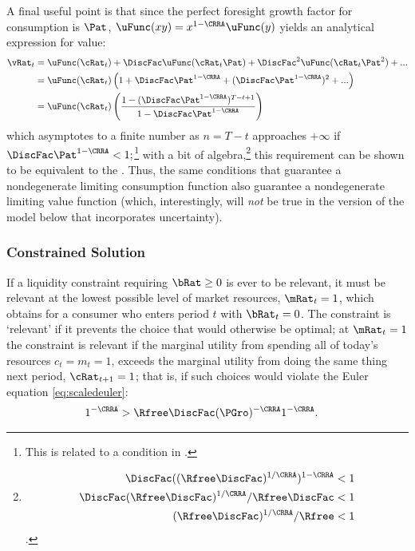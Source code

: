 \documentclass[BufferStockTheory]{subfiles}
\begin{document}
\hypertarget{ValuePFAnalytical}{}
A final useful point is that since the perfect foresight
growth factor for consumption is $\Pat$, $\uFunc(xy) =
x^{1-\CRRA}\uFunc(y)$ yields an analytical expression for value:  
\begin{equation}\begin{gathered}\begin{aligned}
  \vRat_{t}  & = \uFunc(\cRat_{t})+\DiscFac \uFunc(\cRat_{t}\Pat)+\DiscFac^{2} \uFunc(\cRat_{t} \Pat^{2})+... \label{eq:ValuePFAnalytical}
  \\  & = \uFunc(\cRat_{t})\left(1+\DiscFac \Pat^{1-\CRRA}+(\DiscFac \Pat^{1-\CRRA})^{2}+...\right) \notag 
  \\  & = \uFunc(\cRat_{t})\left(\frac{1-(\DiscFac \Pat^{1-\CRRA})^{T-t+1}}{1-\DiscFac \Pat^{1-\CRRA}}\right) \notag
\end{aligned}\end{gathered}\end{equation}
which asymptotes to a finite number as $n=T-t$ approaches $+\infty$ if $\DiscFac \Pat^{1-\CRRA} < 1;$\footnote{This is related to a condition in \cite{asHomogeneous}.} with a bit of algebra,\footnote{
  \begin{align*}
    \DiscFac ((\Rfree \DiscFac)^{1/\CRRA})^{1-\CRRA}  & < 1
    \\ \DiscFac (\Rfree\DiscFac)^{1/\CRRA}/\Rfree\DiscFac  & < 1
    \\ (\Rfree \DiscFac)^{1/\CRRA} /\Rfree  & < 1
  \end{align*}.
} this requirement can be shown to be equivalent to the {\RIC}.  Thus, the same conditions that guarantee a nondegenerate limiting consumption function also guarantee a nondegenerate limiting value function (which, interestingly, will \textit{not} be true in the version of the model below that incorporates uncertainty).


\hypertarget{Constrained-Solution}{}
\subsubsection{Constrained Solution}

If a liquidity constraint requiring $\bRat \geq 0$ is ever to be relevant, it must be
relevant at the lowest possible level of market resources,
$\mRat_{t}=1$, which obtains for a consumer who enters period $t$ with
$\bRat_{t}=0$.  The constraint is `relevant' if
it prevents the choice that would otherwise be optimal; at
$\mRat_{t}=1$ the constraint is relevant if the marginal utility from spending all of today's
resources $c_{t}=m_{t}=1$, exceeds the marginal utility from
doing the same thing next period, $\cRat_{t+1}=1$; that is, if such
choices would violate the Euler equation \eqref{eq:scaledeuler}:
\begin{equation}\begin{gathered}\begin{aligned}
  1^{-\CRRA}  & > \Rfree \DiscFac (\PGro)^{-\CRRA}1^{-\CRRA}  \label{eq:LiqConstrBinds}.
\end{aligned}\end{gathered}\end{equation}
\end{document}
